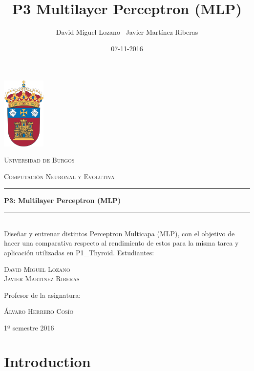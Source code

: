 \documentclass[a4paper,12pt,titlepage]{article}
\newcommand{\HRule}[1]{\rule{\linewidth}{#1}}
\begin{document}
\author{David Miguel Lozano \ Javier Martínez Riberas}
\title{P3 Multilayer Perceptron (MLP)}
\date{07-11-2016}

\begin{titlepage}
	\centering
	\includegraphics[width=0.16\textwidth]{ubu-logo.png}\par
	\vspace{0.3cm}
	{\scshape\LARGE Universidad de Burgos \par}
	\vfill
	{\scshape\Large Computación Neuronal y Evolutiva \par}
	\HRule{2pt}
	{\huge\bfseries P3: Multilayer Perceptron (MLP) \par}
	\HRule{2pt}
	\\ [0.5cm]
	{Diseñar y entrenar distintos Perceptron Multicapa (MLP), con el objetivo de hacer una comparativa respecto al rendimiento de estos para la misma tarea y aplicación utilizadas en P1\_Thyroid.}
	\vfill
	Estudiantes:\par
	{\Large\scshape David Miguel Lozano \\ Javier Martínez Riberas \par}
	\vfill
	Profesor de la asignatura:\par
	\textsc{Álvaro Herrero Cosío}
	\vfill
	{\large 1º semestre 2016 \par}
\end{titlepage}

\newpage
\tableofcontents
\begin{appendix}
\end{appendix}

\newpage

\section{Introduction}
\end{document}
